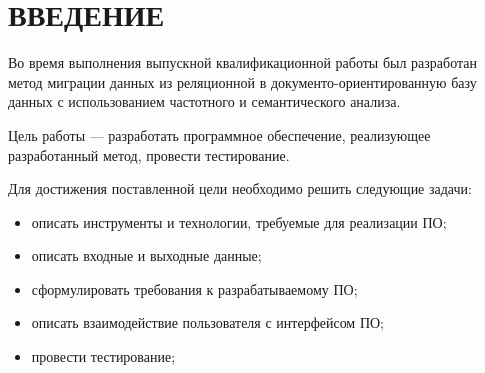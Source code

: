 \chapter*{ВВЕДЕНИЕ}

Во время выполнения выпускной квалификационной работы был разработан
метод миграции данных из реляционной в документо-ориентированную базу данных
с использованием частотного и семантического анализа.

Цель работы --- разработать программное обеспечение, реализующее разработанный метод,
провести тестирование.

Для достижения поставленной цели необходимо решить следующие задачи:
\begin{itemize}[label=---]
  \item описать инструменты и технологии, требуемые для реализации ПО;
  \item описать входные и выходные данные;
  \item сформулировать требования к разрабатываемому ПО;
  \item описать взаимодействие пользователя с интерфейсом ПО;
  \item провести тестирование;
\end{itemize}

  
